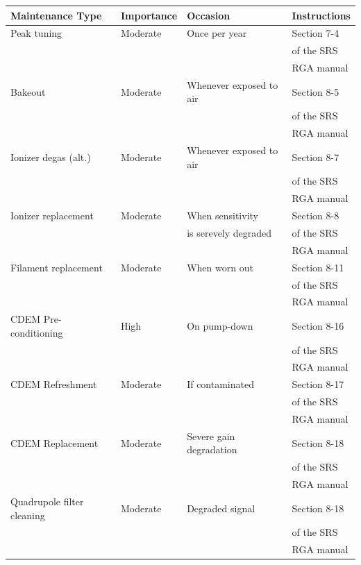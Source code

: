 \begin{table}[H]
  \centering
  \begin{tabular}{llll}
    \hline
    Maintenance Type & Importance & Occasion & Instructions \\
    \hline
    Peak tuning & Moderate & Once per year & Section 7-4  \\
    &&& of the SRS \\
    &&& RGA manual \\
    Bakeout & Moderate & Whenever exposed to air & Section 8-5 \\
    &&& of the SRS \\
    &&& RGA manual \\
    Ionizer degas (alt.) & Moderate & Whenever exposed to air &
    Section 8-7 \\
    &&& of the SRS \\
    &&& RGA manual \\
    Ionizer replacement & Moderate & When sensitivity & Section 8-8 \\
    && is serevely degraded & of the SRS \\
    &&& RGA manual \\
    Filament replacement & Moderate & When worn out &
    Section 8-11 \\
    &&& of the SRS \\
    &&& RGA manual \\
    CDEM Pre-conditioning & High & On pump-down &
    Section 8-16 \\
    &&& of the SRS \\
    &&& RGA manual \\
    CDEM Refreshment & Moderate & If contaminated &
    Section 8-17 \\
    &&& of the SRS \\
    &&& RGA manual \\
    CDEM Replacement & Moderate & Severe gain degradation&
    Section 8-18 \\
    &&& of the SRS \\
    &&& RGA manual \\
    Quadrupole filter cleaning & Moderate & Degraded signal &
    Section 8-18 \\
    &&& of the SRS \\
    &&& RGA manual \\
    \hline
  \end{tabular}
\end{table}

\pagebreak

